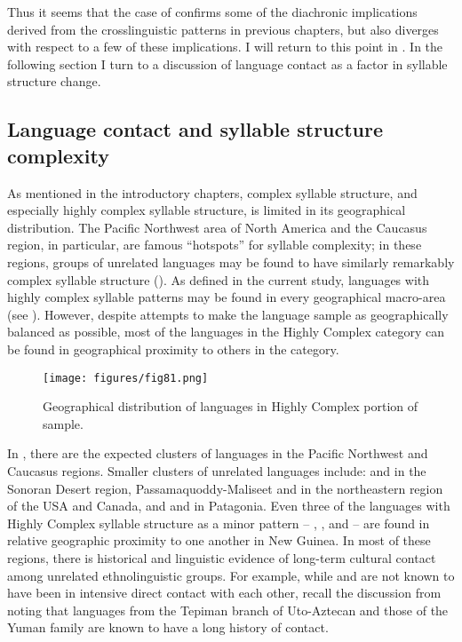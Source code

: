   Thus it seems that the case of  confirms some of the diachronic implications derived from the crosslinguistic patterns in previous chapters, but also diverges with respect to a few of these implications. I will return to this point in . In the following section I turn to a discussion of language contact as a factor in syllable structure change.\pagebreak

\subsection{Language contact and syllable structure complexity}\label{sec:8.4.5}

  As mentioned in the introductory chapters, complex syllable structure, and especially highly complex syllable structure, is limited in its geographical distribution. The Pacific Northwest area of North America and the Caucasus region, in particular, are famous ``hotspots'' for syllable complexity; in these regions, groups of unrelated languages may be found to have similarly remarkably complex syllable structure (\citealt{Chirikba2008,ThompsonKinkade1990}). As defined in the current study, languages with highly complex syllable patterns may be found in every geographical macro-area (see ). However, despite attempts to make the language sample as geographically balanced as possible, most of the languages in the Highly Complex category can be found in geographical proximity to others in the category.

  
\begin{figure}
\texttt{[image: figures/fig81.png]}
\caption{\label{fig:8.1}Geographical distribution of languages in Highly Complex portion of sample.}
\end{figure}

  In , there are the expected clusters of languages in the Pacific Northwest and Caucasus regions. Smaller clusters of unrelated languages include:  and  in the Sonoran Desert region, Pas\-sa\-ma\-quod\-dy-Ma\-li\-seet and  in the northeastern region of the USA and Canada, and  and  in Patagonia. Even three of the languages with Highly Complex syllable structure as a minor pattern -- , , and  -- are found in relative geographic proximity to one another in New Guinea. In most of these regions, there is historical and linguistic evidence of long-term cultural contact among unrelated ethnolinguistic groups. For example, while  and  are not known to have been in intensive direct contact with each other, recall the discussion from  noting that languages from the Tepiman branch of Uto-Aztecan and those of the Yuman family are known to have a long history of contact. 

